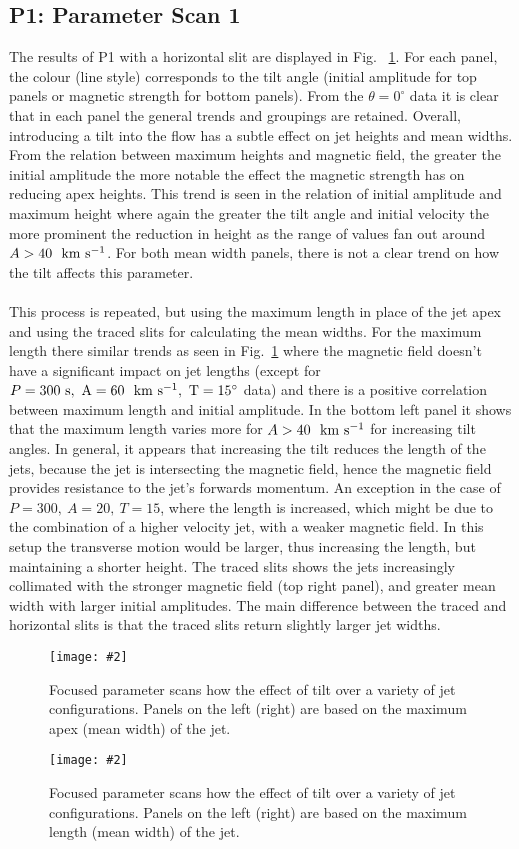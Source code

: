 \documentclass[12pt]{ociamthesis}
\newcommand{\mfig}[4]{
  \begin{figure}
  \begin{center}
  \texttt{[image: \#2]}
  \caption{#3}
  \label{#4}
  \end{center}
  \end{figure}}
\newcommand{\kms}{~\rm{km ~s^{-1}}}
\newcommand{\np}{\\ \\}
\begin{document}
\subsection{P1: Parameter Scan 1}
\label{subsec:pscansII_I}
The results of P1 with a horizontal slit are displayed in Fig. ~\ref{p_scan_t_apex}. For each panel, the colour (line style) corresponds to the tilt angle (initial amplitude for top panels or magnetic strength for bottom panels). From the $\theta=0^{\circ}$ data it is clear that in each panel the general trends and groupings are retained. Overall, introducing a tilt into the flow has a subtle effect on jet heights and mean widths. From the relation between maximum heights and magnetic field, the greater the initial amplitude the more notable the effect the magnetic strength has on reducing apex heights. This trend is seen in the relation of initial amplitude and maximum height where again the greater the tilt angle and initial velocity the more prominent the reduction in height as the range of values fan out around $A>40~\kms$. For both mean width panels, there is not a clear trend on how the tilt affects this parameter. \np
%
This process is repeated, but using the maximum length in place of the jet apex and using the traced slits for calculating the mean widths. For the maximum length there similar trends as seen in Fig.~\ref{p_scan_t_apex} where the magnetic field doesn't have a significant impact on jet lengths (except for $P=300~\rm{s},~A=60~\kms,~T=15^{\circ}$ data) and there is a positive correlation between maximum length and initial amplitude. In the bottom left panel it shows that the maximum length varies more for $A>40~\kms$ for increasing tilt angles. In general, it appears that increasing the tilt reduces the length of the jets, because the jet is intersecting the magnetic field, hence the magnetic field provides resistance to the jet's forwards momentum. An exception in the case of $P=300,~A=20,~T=15$, where the length is increased, which might be due to the combination of a higher velocity jet, with a weaker magnetic field. In this setup the transverse motion would be larger, thus increasing the length, but maintaining a shorter height. The traced slits shows the jets increasingly collimated with the stronger magnetic field (top right panel), and greater mean width with larger initial amplitudes. The main difference between the traced and horizontal slits is that the traced slits return slightly larger jet widths.
\mfig{1}{figures/horizontal_slit_pscan_fixing.png}{Focused parameter scans how the effect of tilt over a variety of jet configurations. Panels on the left (right) are based on the maximum apex (mean width) of the jet.}{p_scan_t_apex}
%
\mfig{1}{figures/traced_slit_pscan_fixing.png}{Focused parameter scans how the effect of tilt over a variety of jet configurations. Panels on the left (right) are based on the maximum length (mean width) of the jet.}{p_scan_t_len}
\end{document}
